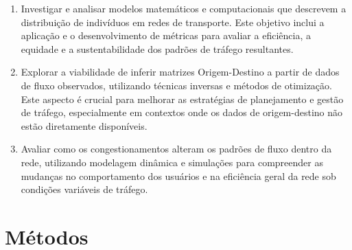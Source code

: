 \documentclass{article}
\begin{document}
\begin{enumerate}
    \item Investigar e analisar modelos matemáticos e computacionais que descrevem a distribuição de indivíduos em redes de transporte. Este objetivo inclui a aplicação e o desenvolvimento de métricas para avaliar a eficiência, a equidade e a sustentabilidade dos padrões de tráfego resultantes.
    \item Explorar a viabilidade de inferir matrizes Origem-Destino a partir de dados de fluxo observados, utilizando técnicas inversas e métodos de otimização. Este aspecto é crucial para melhorar as estratégias de planejamento e gestão de tráfego, especialmente em contextos onde os dados de origem-destino não estão diretamente disponíveis.
    \item Avaliar como os congestionamentos alteram os padrões de fluxo dentro da rede, utilizando modelagem dinâmica e simulações para compreender as mudanças no comportamento dos usuários e na eficiência geral da rede sob condições variáveis de tráfego.
\end{enumerate}

\newpage

\section{Métodos}
\end{document}
